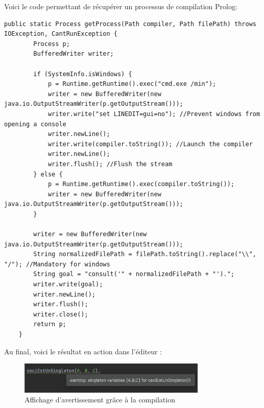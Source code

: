 \noindent Voici le code permettant de récupérer un processus de compilation Prolog:
\begin{lstlisting}[label={lst:get_prolog_process}, caption={Méthode de créer un processus de compilation Prolog}]
    public static Process getProcess(Path compiler, Path filePath) throws IOException, CantRunException {
        Process p;
        BufferedWriter writer;

        if (SystemInfo.isWindows) {
            p = Runtime.getRuntime().exec("cmd.exe /min");
            writer = new BufferedWriter(new java.io.OutputStreamWriter(p.getOutputStream()));
            writer.write("set LINEDIT=gui=no"); //Prevent windows from opening a console
            writer.newLine();
            writer.write(compiler.toString()); //Launch the compiler
            writer.newLine();
            writer.flush(); //Flush the stream
        } else {
            p = Runtime.getRuntime().exec(compiler.toString());
            writer = new BufferedWriter(new java.io.OutputStreamWriter(p.getOutputStream()));
        }

        writer = new BufferedWriter(new java.io.OutputStreamWriter(p.getOutputStream()));
        String normalizedFilePath = filePath.toString().replace("\\", "/"); //Mandatory for windows
        String goal = "consult('" + normalizedFilePath + "').";
        writer.write(goal);
        writer.newLine();
        writer.flush();
        writer.close();
        return p;
    }
\end{lstlisting}

\noindent Au final, voici le résultat en action dans l'éditeur :
\begin{figure}[h]
    \centering
    \includegraphics[width=0.8\textwidth]{images/background_compilation.png}
    \caption{Affichage d'avertissement grâce à la compilation}
    \label{fig:compilation_warnings}
\end{figure}